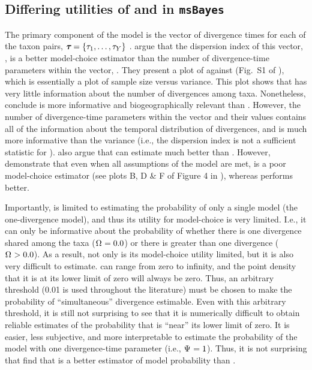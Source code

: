 \subsection{Differing utilities of \numt{} and \vmratio{} in \texttt{msBayes}}
The primary component of the \msb model is the vector of divergence
times for each of the taxon pairs,
$\boldsymbol{\tau_{}} = \{\tau_{1}, \ldots, \tau_{Y}\}$
\citep{Oaks2012}.
\citet{Hickerson2013} argue that the dispersion index of this vector,
\vmratio{}, is a better model-choice estimator than the number of 
divergence-time parameters within the vector,
\numt{}.
They present a plot of \numt{} against \vmratio{} (Fig.~S1 of
\citet{Hickerson2013}), which is essentially a plot of sample size versus
variance.
This plot shows that \vmratio{} has very little information
about the number of divergences among taxa.
Nonetheless, \citet{Hickerson2013} conclude \vmratio{} is more informative and
biogeographically relevant than \numt{}.
However, the number of divergence-time parameters within the vector and their
values contains all of the information about the temporal distribution of
divergences, and is much more informative than the variance (i.e., the
dispersion index is not a sufficient statistic for \divtvector).
\citet{Hickerson2013} also argue that \msb can estimate \vmratio{} much better
than \numt{}.
However, \citet{Oaks2012} demonstrate that even when all assumptions of the
model are met, \vmratio{} is a poor model-choice estimator (see plots B, D \& F
of Figure 4 in \citet{Oaks2012}), whereas \numt{} performs better.

Importantly, \vmratio{} is limited to estimating the probability of only a
single model (the one-divergence model), and thus its utility for model-choice
is very limited.
I.e., it can only be informative about the probability of whether there is one
divergence shared among the taxa ($\Omega_{} = 0.0$) or there is greater than
one divergence ($\Omega_{} > 0.0$).
As a result, not only is its model-choice utility limited, but it is also
very difficult to estimate.
\vmratio{} can range from zero to infinity, and the point density that it is
at its lower limit of zero will always be zero.
Thus, an arbitrary threshold (0.01 is used throughout the \msb literature) must
be chosen to make the probability of ``simultaneous'' divergence estimable.
Even with this arbitrary threshold, it is still not surprising to see that it
is numerically difficult to obtain reliable estimates of the probability that
\vmratio{} is ``near'' its lower limit of zero.
It is easier, less subjective, and more interpretable to estimate the
probability of the model with one divergence-time parameter (i.e., $\Psi_{} =
1$).
Thus, it is not surprising that \citet{Oaks2012} find that \numt{} is a better
estimator of model probability than \vmratio{}.

